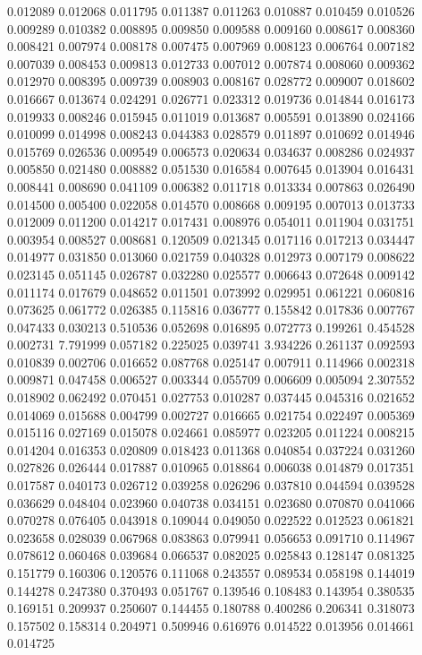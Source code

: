 0.012089
0.012068
0.011795
0.011387
0.011263
0.010887
0.010459
0.010526
0.009289
0.010382
0.008895
0.009850
0.009588
0.009160
0.008617
0.008360
0.008421
0.007974
0.008178
0.007475
0.007969
0.008123
0.006764
0.007182
0.007039
0.008453
0.009813
0.012733
0.007012
0.007874
0.008060
0.009362
0.012970
0.008395
0.009739
0.008903
0.008167
0.028772
0.009007
0.018602
0.016667
0.013674
0.024291
0.026771
0.023312
0.019736
0.014844
0.016173
0.019933
0.008246
0.015945
0.011019
0.013687
0.005591
0.013890
0.024166
0.010099
0.014998
0.008243
0.044383
0.028579
0.011897
0.010692
0.014946
0.015769
0.026536
0.009549
0.006573
0.020634
0.034637
0.008286
0.024937
0.005850
0.021480
0.008882
0.051530
0.016584
0.007645
0.013904
0.016431
0.008441
0.008690
0.041109
0.006382
0.011718
0.013334
0.007863
0.026490
0.014500
0.005400
0.022058
0.014570
0.008668
0.009195
0.007013
0.013733
0.012009
0.011200
0.014217
0.017431
0.008976
0.054011
0.011904
0.031751
0.003954
0.008527
0.008681
0.120509
0.021345
0.017116
0.017213
0.034447
0.014977
0.031850
0.013060
0.021759
0.040328
0.012973
0.007179
0.008622
0.023145
0.051145
0.026787
0.032280
0.025577
0.006643
0.072648
0.009142
0.011174
0.017679
0.048652
0.011501
0.073992
0.029951
0.061221
0.060816
0.073625
0.061772
0.026385
0.115816
0.036777
0.155842
0.017836
0.007767
0.047433
0.030213
0.510536
0.052698
0.016895
0.072773
0.199261
0.454528
0.002731
7.791999
0.057182
0.225025
0.039741
3.934226
0.261137
0.092593
0.010839
0.002706
0.016652
0.087768
0.025147
0.007911
0.114966
0.002318
0.009871
0.047458
0.006527
0.003344
0.055709
0.006609
0.005094
2.307552
0.018902
0.062492
0.070451
0.027753
0.010287
0.037445
0.045316
0.021652
0.014069
0.015688
0.004799
0.002727
0.016665
0.021754
0.022497
0.005369
0.015116
0.027169
0.015078
0.024661
0.085977
0.023205
0.011224
0.008215
0.014204
0.016353
0.020809
0.018423
0.011368
0.040854
0.037224
0.031260
0.027826
0.026444
0.017887
0.010965
0.018864
0.006038
0.014879
0.017351
0.017587
0.040173
0.026712
0.039258
0.026296
0.037810
0.044594
0.039528
0.036629
0.048404
0.023960
0.040738
0.034151
0.023680
0.070870
0.041066
0.070278
0.076405
0.043918
0.109044
0.049050
0.022522
0.012523
0.061821
0.023658
0.028039
0.067968
0.083863
0.079941
0.056653
0.091710
0.114967
0.078612
0.060468
0.039684
0.066537
0.082025
0.025843
0.128147
0.081325
0.151779
0.160306
0.120576
0.111068
0.243557
0.089534
0.058198
0.144019
0.144278
0.247380
0.370493
0.051767
0.139546
0.108483
0.143954
0.380535
0.169151
0.209937
0.250607
0.144455
0.180788
0.400286
0.206341
0.318073
0.157502
0.158314
0.204971
0.509946
0.616976
0.014522
0.013956
0.014661
0.014725
